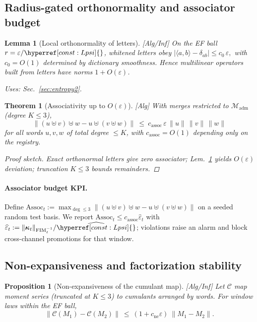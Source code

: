 \documentclass[10pt]{article}
\newcommand{\FIM}{\mathrm{FIM}}
\newcommand{\uses}[1]{\par\smallskip\noindent\textit{Uses: }#1\par\smallskip}
\newenvironment{proofsketch}{\begin{proof}[Proof sketch]}{\end{proof}}
\newcommand{\layertag}[1]{\textup{[#1]}}
\newcommand{\constref}[1]{\hyperref[const:#1]{\ensuremath{\csname constsym#1\endcsname}}}
\newtheorem{lemma}{Lemma}
\newtheorem{theorem}{Theorem}
\newtheorem{proposition}{Proposition}
\begin{document}
\subsection*{Radius-gated orthonormality and associator budget}
\begin{lemma}[Local orthonormality of letters]\label{lem:ortho}
\emph{\layertag{Alg/Inf}}
On the EF ball $r=\varepsilon/\constref{Lpsi}$, whitened letters obey
\(
|\langle a,b\rangle - \delta_{ab}|\le c_0\,\varepsilon,
\)
with $c_0=O(1)$ determined by dictionary smoothness. Hence multilinear operators built from letters have norms $1+O(\varepsilon)$.
\uses{Sec.~\ref{sec:entropy2}.}
\end{lemma}

\begin{theorem}[Associativity up to $O(\varepsilon)$]\label{thm:qshuffle-assoc}
\emph{\layertag{Alg}}
With merges restricted to $\mathcal M_{\mathrm{adm}}$ (degree $K\le 3$),
\[
\big\|(u\uplus v)\uplus w - u\uplus (v\uplus w)\big\|
\ \le\ c_{\mathrm{assoc}}\,\varepsilon\,\|u\|\,\|v\|\,\|w\|
\]
for all words $u,v,w$ of total degree $\le K$, with $c_{\mathrm{assoc}}=O(1)$ depending only on the registry.
\begin{proofsketch}
Exact orthonormal letters give zero associator; Lem.~\ref{lem:ortho} yields $O(\varepsilon)$ deviation; truncation $K\le 3$ bounds remainders.
\end{proofsketch}
\end{theorem}

\paragraph{Associator budget KPI.}
Define $\mathrm{Assoc}_t:=\max_{\deg\le3}\|(u\uplus v)\uplus w-u\uplus(v\uplus w)\|$ on a seeded random test basis.
We report $\mathrm{Assoc}_t \le c_{\mathrm{assoc}}\widehat\varepsilon_t$ with $\widehat\varepsilon_t:=\|\bm\kappa_t\|_{\FIM_t^{-1}}/\widehat{\constref{Lpsi}}$; violations raise an alarm and block cross-channel promotions for that window.

\subsection*{Non-expansiveness and factorization stability}
\begin{proposition}[Non-expansiveness of the cumulant map]\label{prop:nonexp}
\emph{\layertag{Alg/Inf}}
Let $\mathcal C$ map moment series (truncated at $K\!\le\!3$) to cumulants arranged by words.
For window laws within the EF ball,
\[
\|\mathcal C(M_1)-\mathcal C(M_2)\| \ \le\ (1+c_{\mathrm{ne}}\varepsilon)\ \|M_1-M_2\|.
\]
\end{proposition}
\end{document}

